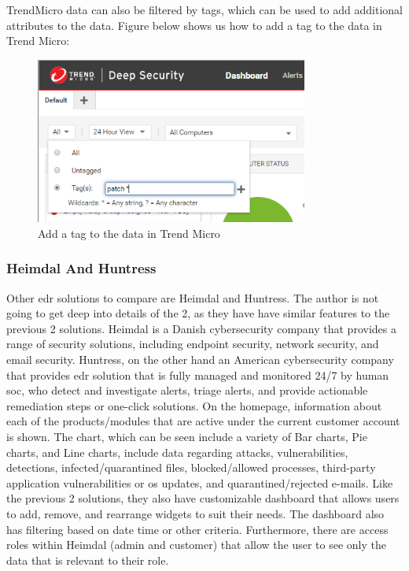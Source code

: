 TrendMicro data can also be filtered by tags, which can be used to add additional attributes to the data.
Figure below shows us how to add a tag to the data in Trend Micro:

\begin{figure}[H]
      \centering
      \includegraphics[width=0.8\textwidth]{Figures/Trend Micro/path.png}
      \caption{Add a tag to the data in Trend Micro}
\end{figure}

\subsubsection{Heimdal\textregistered{} And Huntress}

Other \acrshort{edr} solutions to compare are Heimdal and Huntress. The author is not going to get deep into details of
the 2, as they have have similar features to the previous 2 solutions. Heimdal is a Danish cybersecurity company that
provides a range of security solutions, including endpoint security, network security, and email security. Huntress, on
the other hand an American cybersecurity company that provides \acrshort{edr} solution that is fully managed and
monitored 24/7 by human \acrshort{soc}, who detect and investigate alerts, triage alerts, and provide actionable
remediation steps or one-click solutions. On the homepage,  information about each of the products/modules that are
active under the current customer account is shown. The chart,  which can be seen include a variety of Bar charts, Pie
charts, and Line charts, include data regarding attacks,  vulnerabilities, detections, infected/quarantined files,
blocked/allowed processes, third-party application  vulnerabilities or \acrshort{os} updates, and quarantined/rejected
e-mails. Like the previous 2 solutions, they also have customizable dashboard that allows users to add, remove, and
rearrange widgets to suit their needs. The  dashboard also has filtering based on date time or other criteria. Furthermore,
there are access roles within Heimdal (admin and customer) that allow the user to see only the data that is relevant to
their role.

